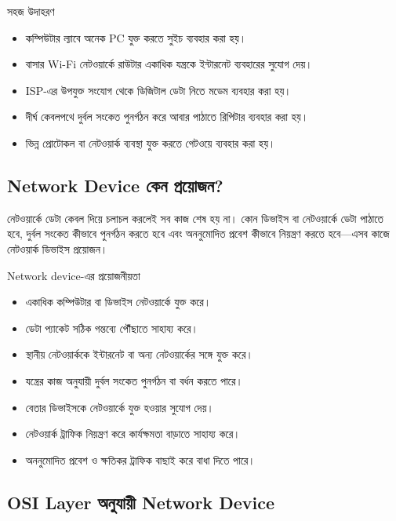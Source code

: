 \begin{examplebox}{সহজ উদাহরণ}
\begin{itemize}
\item কম্পিউটার ল্যাবে অনেক PC যুক্ত করতে সুইচ ব্যবহার করা হয়।
\item বাসার Wi-Fi নেটওয়ার্কে রাউটার একাধিক যন্ত্রকে ইন্টারনেট ব্যবহারের সুযোগ দেয়।
\item ISP-এর উপযুক্ত সংযোগ থেকে ডিজিটাল ডেটা নিতে মডেম ব্যবহার করা হয়।
\item দীর্ঘ কেবলপথে দুর্বল সংকেত পুনর্গঠন করে আবার পাঠাতে রিপিটার ব্যবহার করা হয়।
\item ভিন্ন প্রোটোকল বা নেটওয়ার্ক ব্যবস্থা যুক্ত করতে গেটওয়ে ব্যবহার করা হয়।
\end{itemize}
\end{examplebox}




\subsection{Network Device কেন প্রয়োজন?}

নেটওয়ার্কে ডেটা কেবল দিয়ে চলাচল করলেই সব কাজ শেষ হয় না। কোন ডিভাইস বা নেটওয়ার্কে ডেটা পাঠাতে হবে, দুর্বল সংকেত কীভাবে পুনর্গঠন করতে হবে এবং অননুমোদিত প্রবেশ কীভাবে নিয়ন্ত্রণ করতে হবে—এসব কাজে নেটওয়ার্ক ডিভাইস প্রয়োজন।

\begin{keypointbox}{Network device-এর প্রয়োজনীয়তা}
\begin{itemize}
\item একাধিক কম্পিউটার বা ডিভাইস নেটওয়ার্কে যুক্ত করে।
\item ডেটা প্যাকেট সঠিক গন্তব্যে পৌঁছাতে সাহায্য করে।
\item স্থানীয় নেটওয়ার্ককে ইন্টারনেট বা অন্য নেটওয়ার্কের সঙ্গে যুক্ত করে।
\item যন্ত্রের কাজ অনুযায়ী দুর্বল সংকেত পুনর্গঠন বা বর্ধন করতে পারে।
\item বেতার ডিভাইসকে নেটওয়ার্কে যুক্ত হওয়ার সুযোগ দেয়।
\item নেটওয়ার্ক ট্রাফিক নিয়ন্ত্রণ করে কার্যক্ষমতা বাড়াতে সাহায্য করে।
\item অননুমোদিত প্রবেশ ও ক্ষতিকর ট্রাফিক বাছাই করে বাধা দিতে পারে।
\end{itemize}
\end{keypointbox}

\subsection{OSI Layer অনুযায়ী Network Device}


